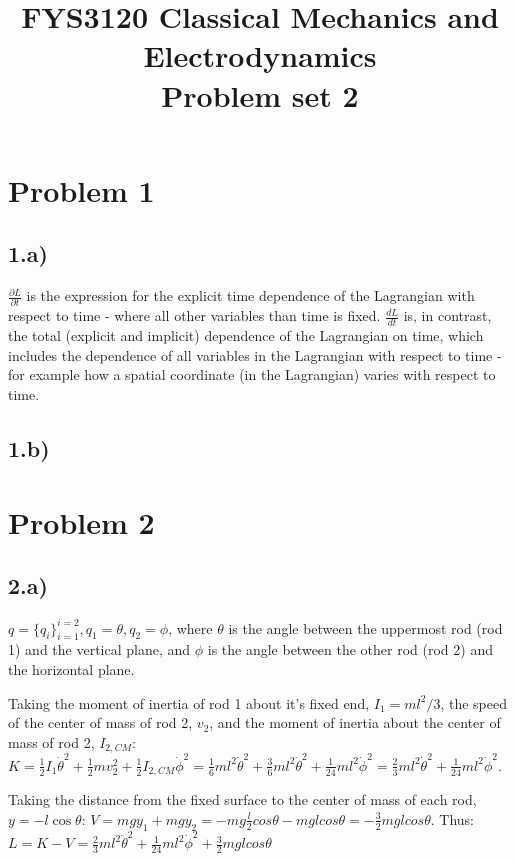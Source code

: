 \documentclass[11pt,a4paper]{report}
\title{FYS3120 Classical Mechanics and Electrodynamics\\ 
\vspace{15mm}Problem set 2}
\begin{document}
\maketitle

\section*{Problem 1}
\subsection*{1.a)}
$\frac{\partial L}{\partial t}$ is the expression for the explicit time dependence of the Lagrangian with respect to time - where all other variables than time is fixed. $\frac{dL}{dt}$ is, in contrast, the total (explicit and implicit) dependence of the Lagrangian on time, which includes the dependence of all variables in the Lagrangian with respect to time - for example how a spatial coordinate (in the Lagrangian) varies with respect to time.
\subsection*{1.b)}
 
\section*{Problem 2}
\subsection*{2.a)}
$q=\{q_i\}_{i=1}^{i=2}, q_1=\theta,q_2=\phi$, where $\theta$ is the angle between the uppermost rod (rod 1) and the vertical plane, and $\phi$ is the angle between the other rod (rod 2) and the horizontal plane. \par

Taking the moment of inertia of rod 1 about it's fixed end, $I_1=ml^2/3$, the speed of the center of mass of rod 2, $v_2$, and the moment of inertia about the center of mass of rod 2, $I_{2,CM}$:
$K=\frac{1}{2}I_1\dot{\theta}^2+\frac{1}{2}m v_2^2+\frac{1}{2}I_{2,CM}\dot{\phi}^2=\frac{1}{6}ml^2\dot{\theta}^2+\frac{3}{6}m l^2\dot{\theta}^2+\frac{1}{24}ml^2\dot{\phi}^2=\frac{2}{3}ml^2\dot{\theta}^2+\frac{1}{24}ml^2\dot{\phi}^2$. \par 
Taking the distance from the fixed surface to the center of mass of each rod, $y=-l \cos \theta$: $V=mgy_1+mgy_2=-mg\frac{l}{2} cos \theta-mglcos \theta=-\frac{3}{2}mgl cos \theta$. Thus: $L=K-V=
\frac{2}{3}ml^2\dot{\theta}^2+\frac{1}{24}ml^2\dot{\phi}^2+\frac{3}{2}mg lcos \theta$
\end{document}
